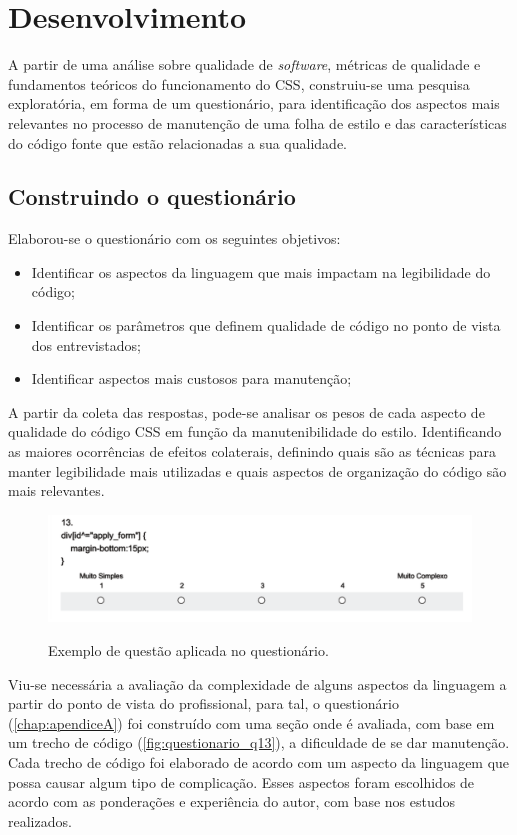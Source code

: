 \chapter{Desenvolvimento}

A partir de uma análise sobre qualidade de \textit{software}, métricas de qualidade e fundamentos teóricos do funcionamento do CSS, construiu-se uma pesquisa exploratória, em forma de um questionário, para identificação dos aspectos mais relevantes no processo de manutenção de uma folha de estilo e das características do código fonte que estão relacionadas a sua qualidade.

\section{Construindo o questionário}
Elaborou-se o questionário com os seguintes objetivos:

\begin{itemize}
	\item Identificar os aspectos da linguagem que mais impactam na legibilidade do código;
	\item Identificar os parâmetros que definem qualidade de código no ponto de vista dos entrevistados;
	\item Identificar aspectos mais custosos para manutenção;	
\end{itemize}

A partir da coleta das respostas, pode-se analisar os pesos de cada aspecto de qualidade do código CSS em função da manutenibilidade do estilo. Identificando as maiores ocorrências de efeitos colaterais, definindo quais são as técnicas para manter legibilidade mais utilizadas e quais aspectos de organização do código são mais relevantes.

\begin{figure}[!htb]
	\centering
	\caption{Exemplo de questão aplicada no questionário.}
	\includegraphics[width=1\textwidth]{./04-figuras/questionario_q13}
	\label{fig:questionario_q13}
\end{figure}

Viu-se necessária a avaliação da complexidade de alguns aspectos da linguagem a partir do ponto de vista do profissional, para tal, o questionário (\autoref{chap:apendiceA}) foi construído com uma seção onde é avaliada, com base em um trecho de código (\autoref{fig:questionario_q13}), a dificuldade de se dar manutenção. Cada trecho de código foi elaborado de acordo com um aspecto da linguagem que possa causar algum tipo de complicação. Esses aspectos foram escolhidos de acordo com as ponderações e experiência do autor, com base nos estudos realizados.

